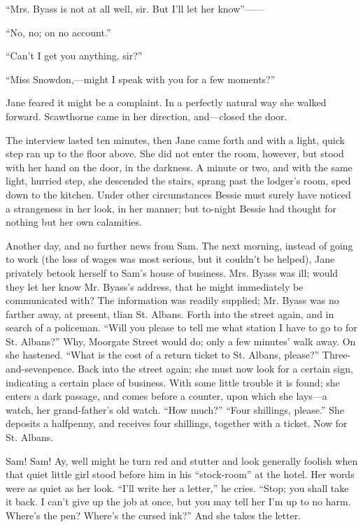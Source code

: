 ``Mrs. Byass is not at all well, sir. But I'll let her know''{{------}}

``No, no; on no account.''

``Can't I get you anything, sir?''

{}``Miss Snowdon,---might I speak with you for a few moments?''

Jane feared it might be a complaint. In a perfectly natural way she
walked forward. Scawthorne came in her direction, and---closed the door.

The interview lasted ten minutes, then Jane came forth and with a light,
quick step ran up to the floor above. She did not enter the room,
however, but stood with her hand on the door, in the darkness. A minute
or two, and with the same light, hurried step, she descended the stairs,
sprang past the lodger's room, sped down to the kitchen. Under other
circumstances Bessie must surely have noticed a strangeness in her look,
in her manner; but to-night Bessie had thought for nothing but her own
calamities.

Another day, and no further news from Sam. The next morning, instead of
going to work (the loss of wages was most serious, but it couldn't be
helped), Jane privately betook herself to Sam's house of business. Mrs.
Byass was ill; would they let her know Mr. Byass's address, that he
might immediately be communicated with? The information was {}readily
supplied; Mr. Byass was no farther away, at present, tlian St. Albans.
Forth into the street again, and in search of a policeman. ``Will you
please to tell me what station I have to go to for St. Albans?'' Why,
Moorgate Street would do; only a few minutes' walk away. On she
hastened. ``What is the cost of a return ticket to St. Albans, please?''
Three-and-sevenpence. Back into the street again; she must now look for
a certain sign, indicating a certain place of business. With some little
trouble it is found; she enters a dark passage, and comes before a
counter, upon which she lays---a watch, her grand-father's old watch.
``How much?'' ``Four shillings, please.'' She deposits a halfpenny, and
receives four shillings, together with a ticket. Now for St. Albans.

Sam! Sam! Ay, well might he turn red and stutter and look generally
foolish when that quiet little girl stood before him in his
``stock-room'' at the hotel. Her words were as quiet as her look. ``I'll
write her a letter,'' he cries. ``Stop; you shall take it back. I can't
give up the job at once, but you may tell her I'm up to no harm. Where's
the pen? {}Where's the cursed ink?'' And she takes the letter.


